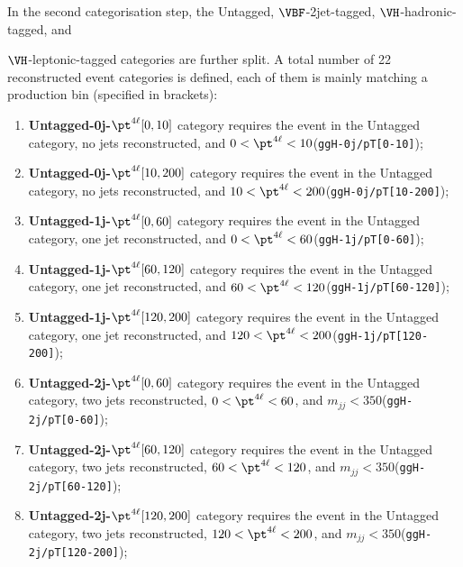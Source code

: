 In the second categorisation step, the {Untagged}, {$\VBF$-2jet-tagged}, {$\VH$-hadronic-tagged}, and {$\VH$-leptonic-tagged categories are further split.
A total number of 22 reconstructed event categories is defined, each of them is mainly matching a production bin (specified in brackets):

\begin{enumerate}
\itemsep0em

\item {\bf Untagged-0j-$\pt^{4\ell}[0,10]$} category requires the event in the Untagged category, no jets reconstructed, and $0<\pt^{4\ell}<10$\GeV ({\tt ggH-0j/pT[0-10]});

\item {\bf Untagged-0j-$\pt^{4\ell}[10,200]$} category requires the event in the Untagged category, no jets reconstructed, and $10<\pt^{4\ell}<200$\GeV ({\tt ggH-0j/pT[10-200]});

\item {\bf Untagged-1j-$\pt^{4\ell}[0,60]$} category requires the event in the Untagged category, one jet reconstructed, and $0<\pt^{4\ell}<60$\GeV ({\tt ggH-1j/pT[0-60]});

\item {\bf Untagged-1j-$\pt^{4\ell}[60,120]$} category requires the event in the Untagged category, one jet reconstructed, and  $60<\pt^{4\ell}<120$\GeV ({\tt ggH-1j/pT[60-120]});

\item {\bf Untagged-1j-$\pt^{4\ell}[120,200]$} category requires the event in the Untagged category, one jet reconstructed, and $120<\pt^{4\ell}<200$\GeV ({\tt ggH-1j/pT[120-200]});
\item {\bf Untagged-2j-$\pt^{4\ell}[0,60]$} category requires the event in the Untagged category, two jets reconstructed, $0<\pt^{4\ell}<60$\GeV, and $m_{jj}<350$\GeV ({\tt ggH-2j/pT[0-60]});

\item {\bf Untagged-2j-$\pt^{4\ell}[60,120]$} category requires the event in the Untagged category, two jets reconstructed, $60<\pt^{4\ell}<120$\GeV, and $m_{jj} <350$\GeV ({\tt ggH-2j/pT[60-120]});

\item {\bf Untagged-2j-$\pt^{4\ell}[120,200]$} category requires the event in the Untagged category, two jets reconstructed, $120<\pt^{4\ell}<200$\GeV, and $m_{jj} <350$\GeV ({\tt ggH-2j/pT[120-200]});


\end{enumerate}}
